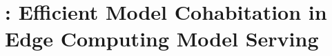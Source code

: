\setchapterpreamble[u]{\margintoc}
\chapter{\roomie{}: Efficient Model Cohabitation in Edge Computing Model Serving}
\label{ch:roomie}











\label{lastpage}